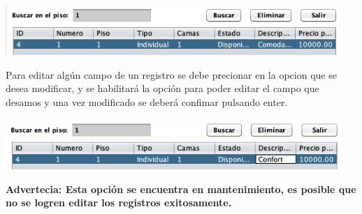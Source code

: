 \documentclass[12pt]{article}
\begin{document}
\begin{flushleft}
\vspace{0.5cm}
\begin{center}
\includegraphics[width=12.75cm]{5.png}
\end{center}
\textsf{Para editar algún campo de un registro se debe precionar en la opcion que se desea modificar, y se habilitará la opción para poder editar el campo que desamos y una vez modificado se deberá confimar pulsando enter. }
\vspace{0.5cm}
\begin{center}
\includegraphics[width=12.75cm]{6.png}
\end{center}
\textbf{Advertecia: Esta opción se encuentra en mantenimiento, es posible que no se logren editar los registros exitosamente.\\}




\end{flushleft}
\end{document}
